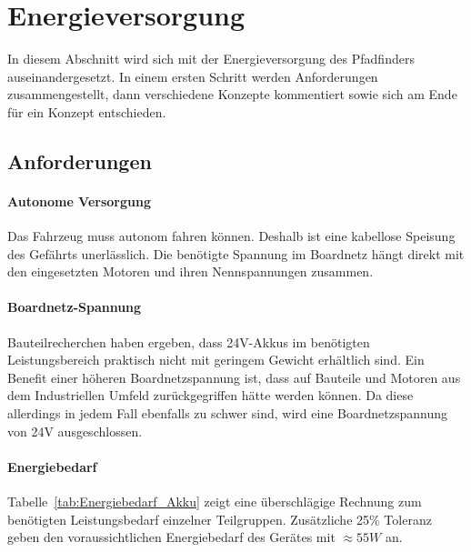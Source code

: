 \documentclass[main.tex]{subfiles} %
\begin{document}

\section{Energieversorgung}

In diesem Abschnitt wird sich mit der Energieversorgung des Pfadfinders
auseinandergesetzt. In einem ersten Schritt werden Anforderungen
zusammengestellt, dann verschiedene Konzepte kommentiert sowie sich am Ende für
ein Konzept entschieden.

\subsection{Anforderungen}

\paragraph{Autonome Versorgung}
Das Fahrzeug muss autonom fahren können. Deshalb ist eine kabellose Speisung
des Gefährts unerlässlich. Die benötigte Spannung im Boardnetz hängt direkt mit
den eingesetzten Motoren und ihren Nennspannungen zusammen.

\paragraph{Boardnetz-Spannung}
Bauteilrecherchen haben ergeben, dass 24V-Akkus im benötigten Leistungsbereich
praktisch nicht mit geringem Gewicht erhältlich sind. Ein Benefit einer höheren
Boardnetzspannung ist, dass auf Bauteile und Motoren aus dem Industriellen
Umfeld zurückgegriffen hätte werden können. Da diese allerdings in jedem Fall
ebenfalls zu schwer sind, wird eine Boardnetzspannung von 24V ausgeschlossen.

\paragraph{Energiebedarf}
Tabelle~\ref{tab:Energiebedarf_Akku} zeigt eine überschlägige Rechnung zum
benötigten Leistungsbedarf einzelner Teilgruppen. Zusätzliche 25\% Toleranz
geben den voraussichtlichen Energiebedarf des Gerätes mit $\approx 55W$ an.
\end{document}
